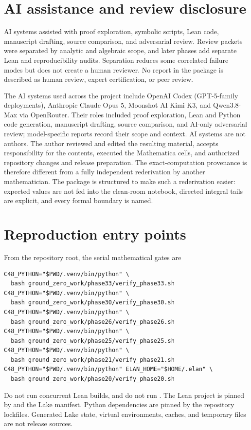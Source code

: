 \documentclass[10pt]{article}
\begin{document}
\section{AI assistance and review disclosure}\label{sup:disclosure}

AI systems assisted with proof exploration, symbolic scripts, Lean code,
manuscript drafting, source comparison, and adversarial review.  Review
packets were separated by analytic and algebraic scope, and later phases add
separate Lean and reproducibility audits.  Separation reduces some correlated
failure modes but does not create a human reviewer.  No report in the package
is described as human review, expert certification, or peer review.

The AI systems used across the project include OpenAI Codex (GPT-5-family
deployments), Anthropic Claude Opus 5, Moonshot AI Kimi K3, and Qwen3.8-Max
via OpenRouter.  Their roles included proof exploration, Lean and Python code
generation, manuscript drafting, source comparison, and AI-only adversarial
review; model-specific reports record their scope and context.  AI systems
are not authors.  The author reviewed and edited the resulting material,
accepts responsibility for the contents, executed the Mathematica cells, and
authorized repository changes and release preparation.
The exact-computation provenance is therefore different from a fully
independent rederivation by another mathematician.  The package is structured
to make such a rederivation easier: expected values are not fed into the
clean-room notebook, directed integral tails are explicit, and every formal
boundary is named.

\section{Reproduction entry points}\label{sup:reproduction}

From the repository root, the serial mathematical gates are
\begin{verbatim}
C48_PYTHON="$PWD/.venv/bin/python" \
  bash ground_zero_work/phase33/verify_phase33.sh
C48_PYTHON="$PWD/.venv/bin/python" \
  bash ground_zero_work/phase30/verify_phase30.sh
C48_PYTHON="$PWD/.venv/bin/python" \
  bash ground_zero_work/phase26/verify_phase26.sh
C48_PYTHON="$PWD/.venv/bin/python" \
  bash ground_zero_work/phase25/verify_phase25.sh
C48_PYTHON="$PWD/.venv/bin/python" \
  bash ground_zero_work/phase21/verify_phase21.sh
C48_PYTHON="$PWD/.venv/bin/python" ELAN_HOME="$HOME/.elan" \
  bash ground_zero_work/phase20/verify_phase20.sh
\end{verbatim}
Do not run concurrent Lean builds, and do not run .  The
Lean project is pinned by  and the Lake manifest.
Python dependencies are pinned by the repository lockfiles.  Generated Lake
state, virtual environments, caches, and temporary files are not release
sources.
\end{document}
